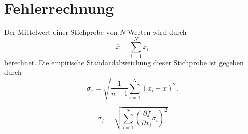 \section{Fehlerrechnung}
Der Mittelwert einer Stichprobe von $N$ Werten wird durch
\begin{equation}
  \overline{x} = \sum\limits_{i = 1}^N x_i
\end{equation}
berechnet.
Die empirische Standardabweichung dieser Stichprobe ist gegeben durch
\begin{equation}
  \sigma_x = \sqrt{\frac{1}{n-1}
    \sum\limits_{i = 1}^N
    (x_i-\overline{x})^2}
.
\end{equation}

\begin{equation}
  \sigma_f = \sqrt{
    \sum\limits_{i = 1}^N
      \left( \frac{\partial f}{\partial x_i} \sigma_i \right)^{\!\! 2}
  }
\end{equation}


\label{sec:Fehlerrechnung}
